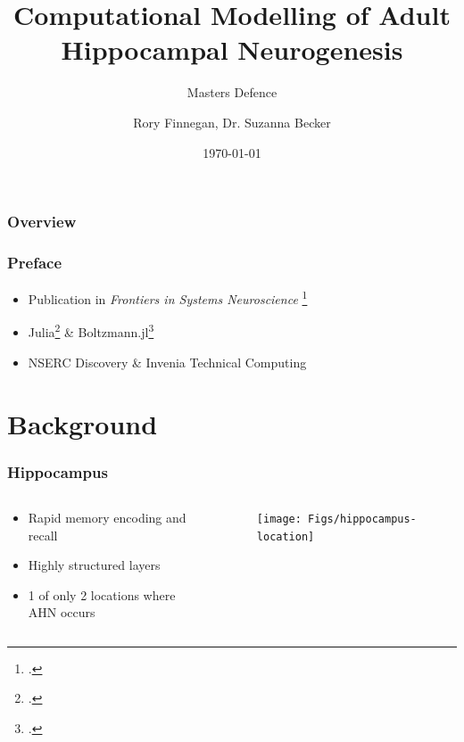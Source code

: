 \documentclass{beamer}
\title{Computational Modelling of Adult Hippocampal Neurogenesis}
\subtitle{Masters Defence}
\author{Rory Finnegan\inst{1}, Dr. Suzanna Becker\inst{2}}
\institute{\href{http://neurosciencemcmaster.ca/}{McMaster Integrative Neuroscience \& Discovery}}
\date{\today} %
\begin{document}
\begin{frame}
\titlepage %
\end{frame}

\begin{frame}
\frametitle{Overview} %
\tableofcontents %
\end{frame}

\hypersetup{urlcolor=blue}

\begin{frame}
\frametitle{Preface}
\begin{itemize}
\item Publication in {\em Frontiers in Systems Neuroscience} \footcite{finnegan-becker-15}
\item Julia\footcite{julialang} \& Boltzmann.jl\footcite{boltzmannjl}
\item NSERC Discovery \& Invenia Technical Computing
\end{itemize}
\end{frame}


\section{Background}

\begin{frame}
\frametitle{Hippocampus}
\begin{columns}
\begin{column}{.49\linewidth}
\begin{itemize}
\item Rapid memory encoding and recall
\item Highly structured layers
\item 1 of only 2 locations where \ac{AHN} occurs
\end{itemize}
\end{column}
\begin{column}{.49\linewidth}
\center
\begin{figure}
\texttt{[image: Figs/hippocampus-location]}
\caption{\citet{gray-1918}}
\label{fig:hippocampus-loc}
\end{figure}
\end{column}
\end{columns}
\end{frame}
\end{document}
